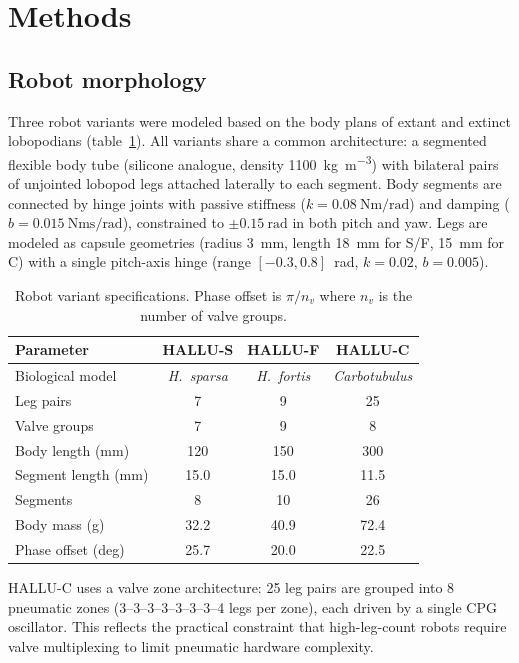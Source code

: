 \documentclass[12pt]{article}
\begin{document}
\section{Methods}
\label{sec:methods}

\subsection{Robot morphology}
\label{sec:morphology}

Three robot variants were modeled based on the body plans of extant and
extinct lobopodians (table~\ref{tab:variants}).
All variants share a common architecture: a segmented flexible body tube
(silicone analogue, density \SI{1100}{\kilogram\per\metre\cubed}) with
bilateral pairs of unjointed lobopod legs attached laterally to each
segment.
Body segments are connected by hinge joints with passive stiffness
($k = \SI{0.08}{\newton\metre\per\radian}$) and damping
($b = \SI{0.015}{\newton\metre\second\per\radian}$), constrained to
$\pm\SI{0.15}{\radian}$ in both pitch and yaw.
Legs are modeled as capsule geometries
(radius \SI{3}{\milli\metre}, length \SI{18}{\milli\metre} for S/F,
\SI{15}{\milli\metre} for C) with a single pitch-axis hinge
(range $[-0.3, 0.8]$~rad, $k = 0.02$, $b = 0.005$).

\begin{table}[ht]
\centering
\caption{Robot variant specifications. Phase offset is $\pi / n_v$
where $n_v$ is the number of valve groups.}
\label{tab:variants}
\begin{tabular}{lccc}
\toprule
Parameter & HALLU-S & HALLU-F & HALLU-C \\
\midrule
Biological model & \textit{H.\ sparsa} & \textit{H.\ fortis} & \textit{Carbotubulus} \\
Leg pairs & 7 & 9 & 25 \\
Valve groups & 7 & 9 & 8 \\
Body length (mm) & 120 & 150 & 300 \\
Segment length (mm) & 15.0 & 15.0 & 11.5 \\
Segments & 8 & 10 & 26 \\
Body mass (g) & 32.2 & 40.9 & 72.4 \\
Phase offset (deg) & 25.7 & 20.0 & 22.5 \\
\bottomrule
\end{tabular}
\end{table}

HALLU-C uses a valve zone architecture: 25 leg pairs are grouped into
8 pneumatic zones (3--3--3--3--3--3--3--4 legs per zone), each driven
by a single CPG oscillator.
This reflects the practical constraint that high-leg-count robots
require valve multiplexing to limit pneumatic hardware complexity.
\end{document}
